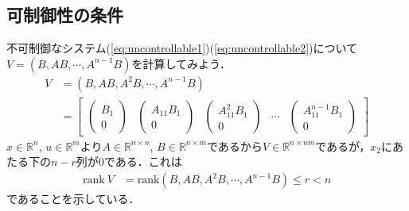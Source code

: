 \subsection{可制御性の条件}

不可制御なシステム(\ref{eq:uncontrollable1})(\ref{eq:uncontrollable2})について$V=(B,AB,\cdots, A^{n-1}B)$を計算してみよう．
\begin{align}
 V & = (B, AB, A^{2}B, \cdots, A^{n-1}B)
\nonumber \\
   & = \left[
          \begin{array}{ccccc}
             \left( 
                \begin{array}{c}
                   B_1 \\
                   0
                \end{array}
             \right)
             &
             \left( 
                \begin{array}{c}
                   A_{11} B_1 \\
                   0
                \end{array}
             \right)
             &
             \left( 
                \begin{array}{c}
                   A_{11}^2 B_1 \\
                   0
                \end{array}
             \right)
             &
             \cdots
             &
             \left( 
                \begin{array}{c}
                   A_{11}^{n-1} B_1 \\
                   0
                \end{array}
             \right)
          \end{array} 
       \right]
\end{align}
$x \in {\mathbb R}^n$, $ u \in {\mathbb R}^m $より$A\in {\mathbb R}^{n \times n}$, $B \in {\mathbb R}^{n \times m}$であるから$V \in {\mathbb R}^{n \times nm}$であるが，$x_2$にあたる下の$n-r$列が$0$である．これは
\begin{align}
 \mbox{rank}\ V &= \mbox{rank}  (B, AB, A^{2}B, \cdots, A^{n-1}B) \leq r < n
\end{align}
であることを示している．

